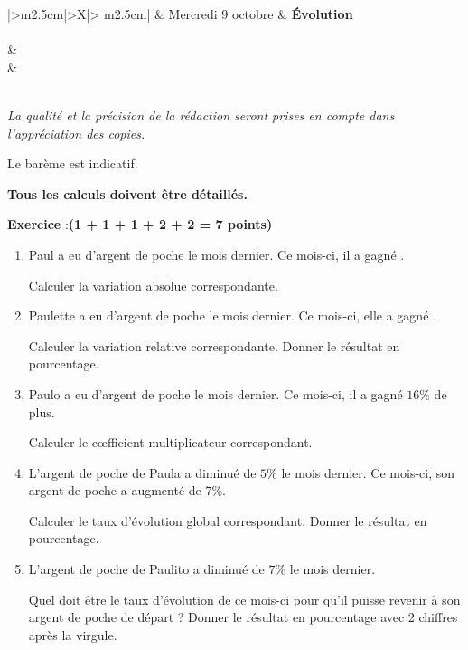 \documentclass[10pt,french]{article}
\newcounter{exoc}
\newenvironment{exoc}[1]{%
  \refstepcounter{exoc}\textbf{Exercice \theexoc} :\hfill {\textbf{(#1)}}\par
  \medskip}%
{\medskip}
\begin{document}

\begin{center}
\begin{tabularx}{\textwidth}{|>\centering m{2.5cm}|>\centering X|>{\centering\arraybackslash} m{2.5cm}|}
	\iere {} &  Mercredi 9 octobre  & \textbf{\'Evolution} \\
	\hline
		 \\
	\hline
         &  \\
		 &  \\
	\hline
         \\[1cm]
    \hline
\end{tabularx}\bigskip

{\itshape
La qualité et la précision de la rédaction seront prises en compte dans l'appréciation des copies.\par
Le barème est indicatif.\par
\textbf{Tous les calculs doivent être détaillés.}}
\end{center}

\begin{exoc}{1 + 1 + 1 + 2 + 2 = 7 points}
\begin{enumerate}
    \item Paul a eu  d'argent de poche le mois dernier. Ce mois-ci, il a gagné .\par Calculer la variation absolue correspondante.
    \item Paulette a eu  d'argent de poche le mois dernier. Ce mois-ci, elle a gagné .\par Calculer la variation relative correspondante. Donner le résultat en pourcentage.
    \item Paulo a eu  d'argent de poche le mois dernier. Ce mois-ci, il a gagné $16\%$ de plus.\par Calculer le c{\oe}fficient multiplicateur correspondant.
    \item L'argent de poche de Paula a diminué de $5\%$ le mois dernier. Ce mois-ci, son argent de poche a augmenté de $7\%$.\par Calculer le taux d'évolution global correspondant. Donner le résultat en pourcentage.
    \item L'argent de poche de Paulito a diminué de $7\%$ le mois dernier.\par Quel doit être le taux d'évolution de ce mois-ci pour qu'il puisse revenir à son argent de poche de départ ? Donner le résultat en pourcentage avec 2 chiffres après la virgule.
\end{enumerate}
\end{exoc}
\end{document}
